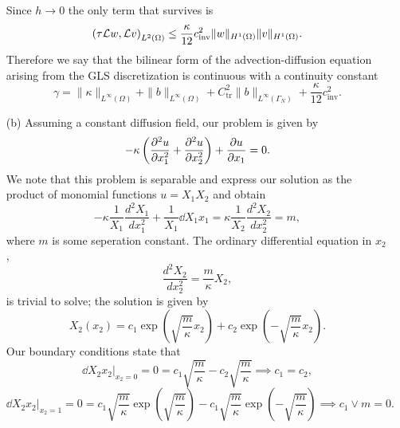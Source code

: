 \documentclass{article}
\begin{document}
\begin{itemize}
\begin{equation*}
	\end{equation*}
	Since \(h \to 0\) the only term that survives is
	\begin{equation*}
		\left(\tau\mathcal{L} w, \mathcal{L} v \right)_{L^2(\Omega)} \leq \frac{\kappa}{12}c_\text{inv}^2 \|w\|_{H^1(\Omega)} \|v\|_{H^1(\Omega)}.
	\end{equation*}
	Therefore we say that the bilinear form of the advection-diffusion equation arising from the GLS discretization is continuous with a continuity constant
	\begin{equation*}
		\gamma = \|\kappa\|_{L^\infty(\Omega)} + \|b\|_{L^\infty(\Omega)} + C^2_\text{tr}\|b\|_{L^\infty(\Gamma_N)} + \frac{\kappa}{12}c_\text{inv}^2.
	\end{equation*}
	
	\item[(b)] Assuming a constant diffusion field, our problem is given by
	\begin{equation*}
		-\kappa\left(\dfrac{\partial^2u}{\partial x_1^2} + \dfrac{\partial^2u}{\partial x_2^2} \right) + \frac{\partial u}{\partial x_1} = 0.
	\end{equation*}
	We note that this problem is separable and express our solution as the product of monomial functions \(u = X_1X_2 \) and obtain
	\begin{equation*}
		-\kappa\dfrac{1}{X_1}\dfrac{d^2X_1}{dx_1^2} + \dfrac{1}{X_1}\dd{X_1}{x_1} = \kappa \dfrac{1}{X_2}\dfrac{d^2X_2}{dx_2^2} = m,
	\end{equation*}
	where \(m\) is some seperation constant. The ordinary differential equation in \(x_2 \),
	\begin{equation*}
		\dfrac{d^2X_2}{dx_2^2} = \dfrac{m}{\kappa}X_2,
	\end{equation*}
	is trivial to solve; the solution is given by
	\begin{equation*}
		X_2(x_2) = c_1\exp\left(\sqrt{\frac{m}{\kappa}}x_2\right) + c_2\exp\left(-\sqrt{\frac{m}{\kappa}}x_2\right).
	\end{equation*}
	Our boundary conditions state that
	\begin{equation*}
		\left.\dd{X_2}{x_2}\right|_{x_2 = 0} = 0 = c_1\sqrt{\dfrac{m}{\kappa}} - c_2\sqrt{\dfrac{m}{\kappa}} \implies c_1 = c_2,
	\end{equation*}
	\begin{equation*}
		\left.\dd{X_2}{x_2}\right|_{x_2 = 1} = 0 = c_1\sqrt{\dfrac{m}{\kappa}}\exp\left(\sqrt{\frac{m}{\kappa}}\right) - c_1\sqrt{\dfrac{m}{\kappa}}\exp\left(-\sqrt{\frac{m}{\kappa}}\right) \implies c_1 \vee m = 0.
	\end{equation*}

\end{itemize}
\end{document}
